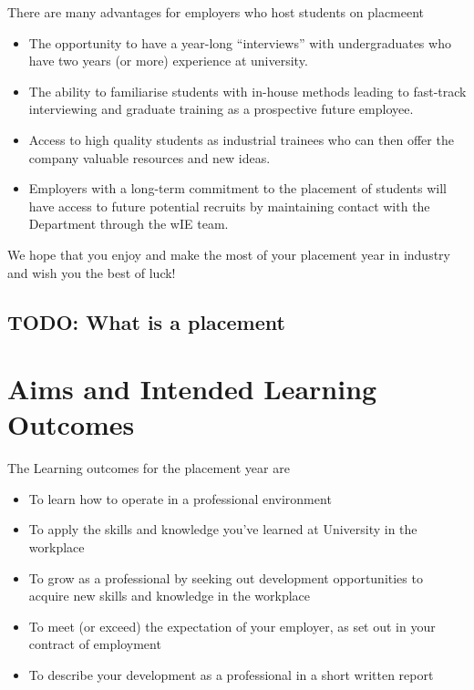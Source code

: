 \documentclass[
]{book}
\providecommand{\tightlist}{%
  \setlength{\itemsep}{0pt}\setlength{\parskip}{0pt}}
\begin{document}
There are many advantages for employers who host students on placmeent

\begin{itemize}
\tightlist
\item
  The opportunity to have a year-long ``interviews'' with undergraduates who have two years (or more) experience at university.
\item
  The ability to familiarise students with in-house methods leading to fast-track interviewing and graduate
  training as a prospective future employee.
\item
  Access to high quality students as industrial trainees who can then offer the company valuable resources and new ideas.
\item
  Employers with a long-term commitment to the placement of students will have access to future potential recruits by maintaining contact with the Department through the wIE team.
\end{itemize}

We hope that you enjoy and make the most of your placement year in industry and wish you the best of luck!

\section{TODO: What is a placement}\label{todo-what-is-a-placement}

\chapter{Aims and Intended Learning Outcomes}\label{aims-and-intended-learning-outcomes}

The Learning outcomes for the placement year are

\begin{itemize}
\tightlist
\item
  To learn how to operate in a professional environment
\item
  To apply the skills and knowledge you've learned at University in the workplace
\item
  To grow as a professional by seeking out development opportunities to acquire new skills and knowledge in the workplace
\item
  To meet (or exceed) the expectation of your employer, as set out in your contract of employment
\item
  To describe your development as a professional in a short written report
\end{itemize}
\end{document}
